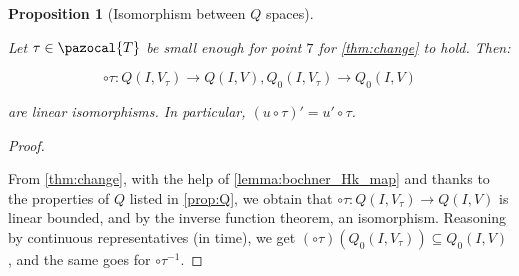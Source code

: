 \documentclass[english,a4paper,9pt,oneside]{scrbook}	%
\theoremstyle{break}
\newtheorem{prop}[equation]{Proposition}
\newenvironment{mproof}[1][\proofname]{%
  \begin{proof}[#1]$ $\par\nobreak\ignorespaces
}{%
  \end{proof}
}
\renewcommand*{\proofname}{Proof}
\theoremstyle{remark}
\newcommand{\norm}[1]{\left\lVert#1\right\rVert}
\newcommand{\tr}{\text{tr}}
\newcommand{\cT}{\pazocal{T}}
\newcommand{\tred}[1]{\textcolor{red}{#1}}
\begin{document}
\begin{appendices}
%
%
%
%
%
%
%
%
%
%		
%


\begin{prop}[Isomorphism between $Q$ spaces]
\label{prop:change_boch}

Let $\tau \in \cT$ be small enough for point $7$ for \cref{thm:change} to hold. Then:

$$\circ \tau : Q(I,V_\tau)\rightarrow Q(I,V), Q_0(I,V_\tau)\rightarrow Q_0(I,V)$$

are linear isomorphisms. In particular, $(u\circ \tau)' = u'\circ \tau$.

\end{prop}

\begin{mproof}
From \cref{thm:change}, with the help of \cref{lemma:bochner_Hk_map} and thanks to the properties of $Q$ listed in \cref{prop:Q}, we obtain that $\circ \tau : Q(I,V_\tau)\rightarrow Q(I,V)$ is linear bounded, and by the inverse function theorem, an isomorphism. Reasoning by continuous representatives (in time), we get $(\circ \tau)(Q_0(I,V_\tau))\subseteq Q_0(I,V)$, and the same goes for $\circ \tau^{-1}$.
\end{mproof}



\end{appendices}
\end{document}
